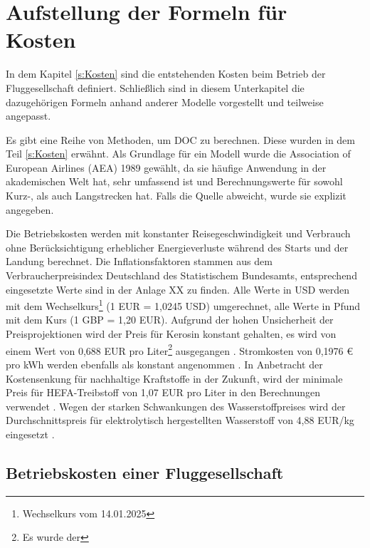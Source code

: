 \section{Aufstellung der Formeln für Kosten}
\label{s:Aufstellung der Formeln für Kosten}

In dem Kapitel \ref{s:Kosten} sind die entstehenden Kosten beim Betrieb der Fluggesellschaft definiert.
Schließlich sind in diesem Unterkapitel die dazugehörigen Formeln anhand anderer Modelle vorgestellt und teilweise angepasst. 

Es gibt eine Reihe von Methoden, um DOC zu berechnen. 
Diese wurden in dem Teil \ref{s:Kosten} erwähnt.
Als Grundlage für ein Modell wurde die Association of European Airlines (AEA) 1989 gewählt, 
da sie häufige Anwendung in der akademischen Welt hat, 
sehr umfassend ist und Berechnungswerte für sowohl Kurz-, als auch Langstrecken hat. 
Falls die Quelle abweicht, wurde sie explizit angegeben. %

Die Betriebskosten werden mit konstanter Reisegeschwindigkeit und Verbrauch ohne 
Berücksichtigung erheblicher Energieverluste während des Starts und der Landung berechnet. 
Die Inflationsfaktoren stammen aus dem Verbraucherpreisindex Deutschland des Statistischem Bundesamts, 
entsprechend eingesetzte Werte sind in der Anlage XX zu finden. %
Alle Werte in USD werden mit dem Wechselkurs\footnote{Wechselkurs vom 14.01.2025} (1 EUR = 1,0245 USD)
umgerechnet, alle Werte in Pfund mit dem Kurs (1 GBP = 1,20 EUR).
Aufgrund der hohen Unsicherheit der Preisprojektionen wird der Preis für Kerosin 
konstant gehalten, es wird von einem Wert von 0,688 EUR pro Liter\footnote{Es wurde der } ausgegangen \cite{iata_industry_statistics_2024}. 
Stromkosten von 0,1976 € pro kWh werden ebenfalls als konstant angenommen \cite{eurostat_nrg_pc_205}.
In Anbetracht der Kostensenkung für nachhaltige Kraftstoffe in der Zukunft, 
wird der minimale Preis für HEFA-Treibstoff von 1,07 EUR pro Liter in den Berechnungen verwendet \cite{watson2024sustainable}.
Wegen der starken Schwankungen des Wasserstoffpreises wird der Durchschnittspreis für 
elektrolytisch hergestellten Wasserstoff von 4,88 EUR/kg eingesetzt \cite{hoelzen2022hydrogen}.
%
%
\subsection{Betriebskosten einer Fluggesellschaft}


